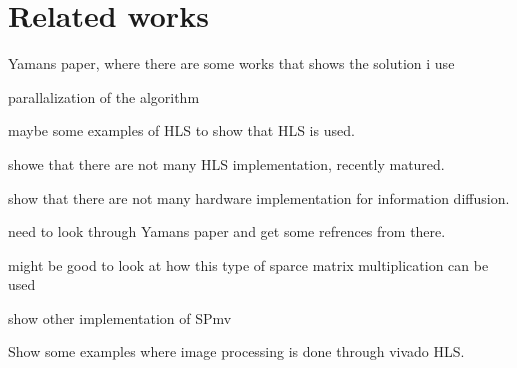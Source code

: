 \chapter{Related works} \label{relatedWork}

\begin{list_type}  
\item Yamans paper, where there are some works that shows the solution i use
\item parallalization of the algorithm
\item maybe some examples of HLS to show that HLS is used.
\item showe that there are not many HLS implementation, recently matured. 
\item show that there are not many hardware implementation for information diffusion.
\item need to look through Yamans paper and get some refrences from there.
\item might be good to look at how this type of sparce matrix multiplication can be used
\item show other implementation of SPmv
\item Show some examples where image processing is done through vivado HLS.
\end{list_type}


